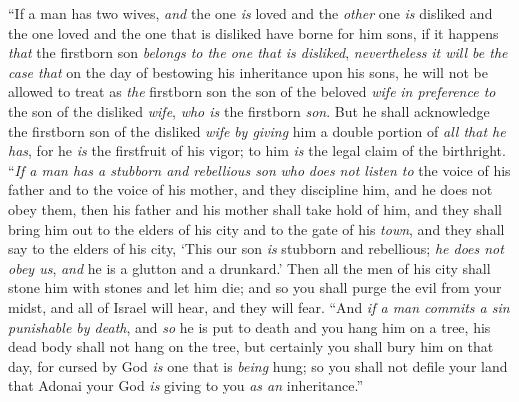 \begin{biblechapter}
\verse “If a man has two wives, \textit{and} the one \textit{is} loved and the \textit{other} one \textit{is} disliked and the one loved and the one that is disliked have borne for him sons, if it happens \textit{that} the firstborn son \textit{belongs to the one that is disliked},
\verse \textit{nevertheless} \textit{it will be the case that} on the day of bestowing his inheritance upon his sons, he will not be allowed to treat as \textit{the} firstborn son the son of the beloved \textit{wife} \textit{in preference to} the son of the disliked \textit{wife}, \textit{who is} the firstborn \textit{son}.
\verse But he shall acknowledge the firstborn son of the disliked \textit{wife} \textit{by giving} him a double portion of \textit{all that he has}, for he \textit{is} the firstfruit of his vigor; to him \textit{is} the legal claim of the birthright.
\verse “\textit{If a man has a stubborn and rebellious son} \textit{who} \textit{does not listen to} the voice of his father and to the voice of his mother, and they discipline him, and he does not obey them,
\verse then his father and his mother shall take hold of him, and they shall bring him out to the elders of his city and to the gate of his \textit{town},
\verse and they shall say to the elders of his city, ‘This our son \textit{is} stubborn and rebellious; \textit{he does not obey us}, \textit{and} he is a glutton and a drunkard.’
\verse Then all the men of his city shall stone him with stones and let him die; and so you shall purge the evil from your midst, and all of Israel will hear, and they will fear.
\verse “And \textit{if a man commits a sin punishable by death}, and \textit{so} he is put to death and you hang him on a tree,
\verse his dead body shall not hang on the tree, but certainly you shall bury him on that day, for cursed by God \textit{is} one that is \textit{being} hung; so you shall not defile your land that Adonai your God \textit{is} giving to you \textit{as an} inheritance.”
\end{biblechapter}

